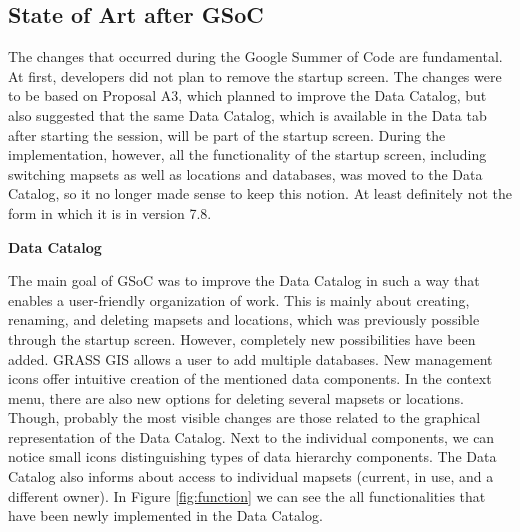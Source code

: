 \documentclass[a4paper,10pt,twoside]{article}
\begin{document}

\subsection{State of Art after GSoC}
\label{sec:afterGSoC}

\noindent The changes that occurred during the Google Summer of Code
are fundamental. At first, developers did not plan to remove the
startup screen. The changes were to be based on Proposal A3, which
planned to improve the Data Catalog, but also suggested that the same
Data Catalog, which is available in the Data tab after starting the
session, will be part of the startup screen. During the
implementation, however, all the functionality of the startup screen,
including switching mapsets as well as locations and databases, was
moved to the Data Catalog, so it no longer made sense to keep this
notion. At least definitely not the form in which it is in version
7.8.

\bigskip
\noindent \textbf {Data Catalog}

\noindent The main goal of GSoC was to improve the Data Catalog in
such a way that enables a user-friendly organization of work. This is
mainly about creating, renaming, and deleting mapsets and locations,
which was previously possible through the startup screen. However,
completely new possibilities have been added. GRASS GIS allows a user
to add multiple databases. New management icons offer intuitive
creation of the mentioned data components. In the context menu, there
are also new options for deleting several mapsets or
locations. Though, probably the most visible changes are those related
to the graphical representation of the Data Catalog. Next to the
individual components, we can notice small icons distinguishing types
of data hierarchy components. The Data Catalog also informs about
access to individual mapsets (current, in use, and a different
owner). In Figure \ref{fig:function} we can see the all
functionalities that have been newly implemented in the Data Catalog.
\end{document}
